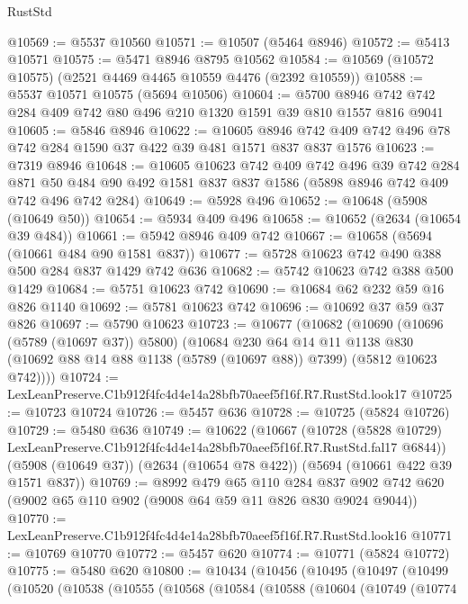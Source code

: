 \begin{lexlean}{RustStd}
\begin{coremodule}
@10569 := @5537 @10560
@10571 := @10507 (@5464 @8946)
@10572 := @5413 @10571
@10575 := @5471 @8946 @8795 @10562
@10584 := @10569 (@10572 @10575) (@2521 @4469 @4465 @10559 @4476 (@2392 @10559))
@10588 := @5537 @10571 @10575 (@5694 @10506)
@10604 := @5700 @8946 @742 @742 @284 @409 @742 @80 @496 @210 @1320 @1591 @39 @810 @1557 @816 @9041
@10605 := @5846 @8946
@10622 := @10605
    @8946
    @742
    @409
    @742
    @496
    @78
    @742
    @284
    @1590
    @37
    @422
    @39
    @481
    @1571
    @837
    @837
    @1576
@10623 := @7319 @8946
@10648 := @10605
    @10623
    @742
    @409
    @742
    @496
    @39
    @742
    @284
    @871
    @50
    @484
    @90
    @492
    @1581
    @837
    @837
    @1586
    (@5898 @8946 @742 @409 @742 @496 @742 @284)
@10649 := @5928 @496
@10652 := @10648 (@5908 (@10649 @50))
@10654 := @5934 @409 @496
@10658 := @10652 (@2634 (@10654 @39 @484))
@10661 := @5942 @8946 @409 @742
@10667 := @10658 (@5694 (@10661 @484 @90 @1581 @837))
@10677 := @5728 @10623 @742 @490 @388 @500 @284 @837 @1429 @742 @636
@10682 := @5742 @10623 @742 @388 @500 @1429
@10684 := @5751 @10623 @742
@10690 := @10684 @62 @232 @59 @16 @826 @1140
@10692 := @5781 @10623 @742
@10696 := @10692 @37 @59 @37 @826
@10697 := @5790 @10623
@10723 := @10677
    (@10682
      (@10690
        (@10696 (@5789 (@10697 @37)) @5800)
        (@10684
          @230
          @64
          @14
          @11
          @1138
          @830
          (@10692 @88 @14 @88 @1138 (@5789 (@10697 @88)) @7399)
          (@5812 @10623 @742))))
@10724 := LexLeanPreserve.C1b912f4fc4d4e14a28bfb70aeef5f16f.R7.RustStd.look17
@10725 := @10723 @10724
@10726 := @5457 @636
@10728 := @10725 (@5824 @10726)
@10729 := @5480 @636
@10749 := @10622
    (@10667
      (@10728
        (@5828 @10729)
        LexLeanPreserve.C1b912f4fc4d4e14a28bfb70aeef5f16f.R7.RustStd.fal17
        @6844))
    (@5908 (@10649 @37))
    (@2634 (@10654 @78 @422))
    (@5694 (@10661 @422 @39 @1571 @837))
@10769 := @8992
    @479
    @65
    @110
    @284
    @837
    @902
    @742
    @620
    (@9002 @65 @110 @902 (@9008 @64 @59 @11 @826 @830 @9024 @9044))
@10770 := LexLeanPreserve.C1b912f4fc4d4e14a28bfb70aeef5f16f.R7.RustStd.look16
@10771 := @10769 @10770
@10772 := @5457 @620
@10774 := @10771 (@5824 @10772)
@10775 := @5480 @620
@10800 := @10434
    (@10456
      (@10495
        (@10497
          (@10499
            (@10520
              (@10538
                (@10555
                  (@10568
                    (@10584
                      (@10588
                        (@10604
                          (@10749
                            (@10774

\end{coremodule}
\end{lexlean}
